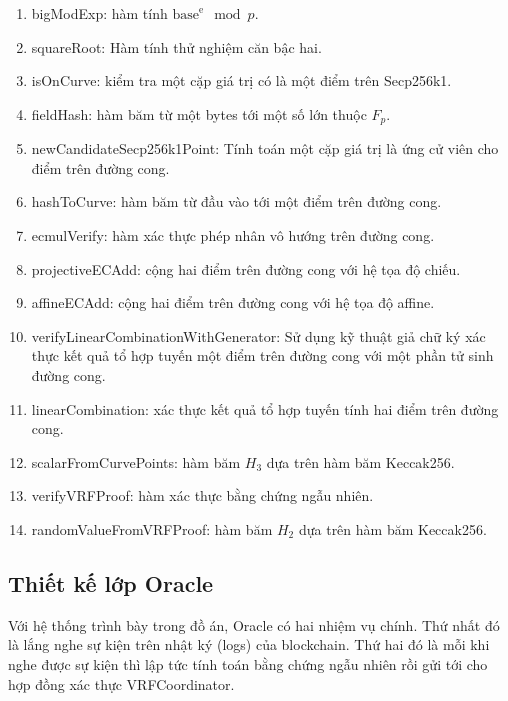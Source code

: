 \documentclass[../main.tex]{subfiles}
\begin{document}
\begin{enumerate}
    \item bigModExp: hàm tính $\text{base}^{\text{e}} \mod{p}$.
    \item squareRoot: Hàm tính thử nghiệm căn bậc hai.
    \item isOnCurve: kiểm tra một cặp giá trị có là một điểm trên Secp256k1.
    \item fieldHash: hàm băm từ một bytes tới một số lớn thuộc $F_p$.
    \item newCandidateSecp256k1Point: Tính toán một cặp giá trị là ứng cử viên cho điểm trên đường cong.
    \item hashToCurve: hàm băm từ đầu vào tới một điểm trên đường cong.
    \item ecmulVerify: hàm xác thực phép nhân vô hướng trên đường cong.
    \item projectiveECAdd: cộng hai điểm trên đường cong với hệ tọa độ chiếu.
    \item affineECAdd: cộng hai điểm trên đường cong với hệ tọa độ affine.
    \item verifyLinearCombinationWithGenerator: Sử dụng kỹ thuật giả chữ ký xác thực kết quả tổ hợp tuyến một điểm trên đường cong với một phần tử sinh đường cong.
    \item linearCombination: xác thực kết quả tổ hợp tuyến tính hai điểm trên đường cong.
    \item scalarFromCurvePoints: hàm băm $H_3$ dựa trên hàm băm Keccak256. 
    \item verifyVRFProof: hàm xác thực bằng chứng ngẫu nhiên.
    \item randomValueFromVRFProof: hàm băm $H_2$ dựa trên hàm băm Keccak256.
\end{enumerate}
\subsection{Thiết kế lớp Oracle}
Với hệ thống trình bày trong đồ án, Oracle có hai nhiệm vụ chính. Thứ nhất đó là lắng nghe sự kiện trên nhật ký (logs) của blockchain. Thứ hai đó là mỗi khi nghe được sự kiện thì lập tức tính toán bằng chứng ngẫu nhiên rồi gửi tới cho hợp đồng xác thực VRFCoordinator.
\end{document}
